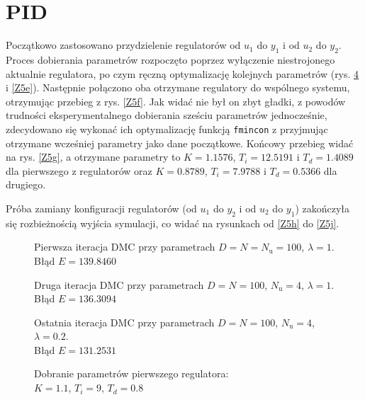 \section{PID}
Początkowo zastosowano przydzielenie regulatorów od $ u_1 $ do $ y_1 $ i od $ u_2 $ do $ y_2 $. Proces dobierania parametrów rozpoczęto poprzez wyłączenie niestrojonego aktualnie regulatora, po czym ręczną optymalizację kolejnych parametrów (rys. \ref{Z5d} i \ref{Z5e}). Następnie połączono oba otrzymane regulatory do wspólnego systemu, otrzymując przebieg z rys. \ref{Z5f}. Jak widać nie był on zbyt gładki, z powodów trudności eksperymentalnego dobierania sześciu parametrów jednocześnie, zdecydowano się wykonać ich optymalizację funkcją \verb|fmincon| z przyjmując otrzymane wcześniej parametry jako dane początkowe. Końcowy przebieg widać na rys. \ref{Z5g}, a otrzymane parametry to 	$ K=\num{1,1576} $, $ T_i=\num{12,5191} $ i $ T_d=\num{1,4089} $ dla pierwszego z regulatorów oraz $ K=\num{0,8789} $, $ T_i=\num{7,9788} $ i $ T_d=\num{0,5366} $ dla drugiego.

Próba zamiany konfiguracji regulatorów (od $ u_1 $ do $ y_2 $ i od $ u_2 $ do $ y_1 $) zakończyła się rozbieżnością wyjścia symulacji, co widać na rysunkach od \ref{Z5h} do \ref{Z5j}.



\begin{figure}[ht]
\centering

\caption{Pierwsza iteracja DMC przy parametrach $ D=N=N_\mathrm{u}=100$, $\lambda=1$. \\Błąd $ E=\num{139,8460} $}
\label{Z5a}
\end{figure}

\begin{figure}[ht]
\centering

\caption{Druga iteracja DMC przy parametrach $ D=N=100$, $ N_\mathrm{u}=4 $, $\lambda=1$. \\Błąd $ E=\num{136,3094} $}
\label{Z5b}
\end{figure}

\begin{figure}[ht]
\centering

\caption{Ostatnia iteracja DMC przy parametrach $ D=N=100$, $ N_\mathrm{u}=4 $, $\lambda=\num{0,2}$. \\Błąd $ E=\num{131.2531} $}
\label{Z5c}
\end{figure}

\begin{figure}[ht]
	\centering
	
	\caption{Dobranie parametrów pierwszego regulatora:\\
	$ K=\num{1,1} $, $ T_i=\num{9} $, $ T_d=\num{0,8} $}
	\label{Z5d}
\end{figure}

